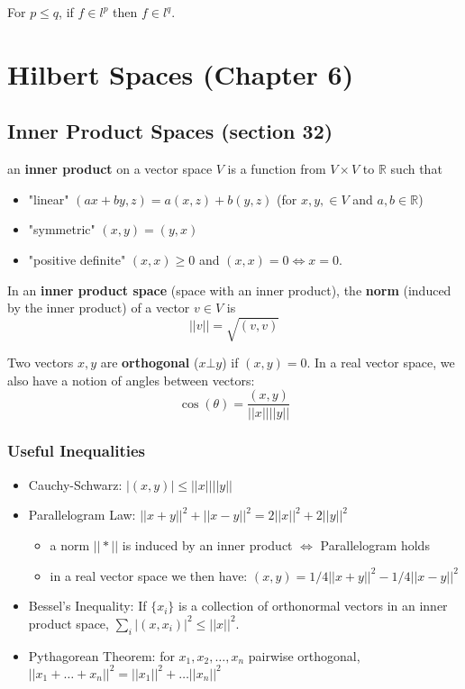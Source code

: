 \documentclass[a4paper, 12pt]{article}
\def\R{\ensuremath{\mathbb{R}}} %
\newcommand{\bt}[1]{\textbf{#1}} %
\newcommand{\gray}[1]{{\leavevmode\color[gray]{0.5}{#1}}} %
\begin{document}
\begin{multicols}{2}
For $p \leq q$, if $f \in l^p$ then $f \in l^q$.
\gray{why? $f \in l^p \implies \sum |a_n|^p$ converges, so $|a_n|^p < 1$ \\
hence $|a_n|^q \leq |a_n|^p$}



\section{Hilbert Spaces (Chapter 6)}

\subsection{Inner Product Spaces (section 32)}
an \bt{inner product} on a vector space $V$ is a function from  $V \times  V$ to $\R$ such that
\begin{itemize}
    \item "linear" $(ax + by, z) = a(x, z) + b(y, z)$ (for $x,y, \in V$ and $a, b \in \R$)

    \item "symmetric" $(x, y) = (y, x)$
    \item "positive definite" $(x, x) \geq 0$ and $(x, x) = 0 \iff x = 0$.
\end{itemize}

In an \bt{inner product space} (space with an inner product), the \bt{norm} 
(induced by the inner product) of a vector $v \in V$ is 
$$|| v || = \sqrt{(v, v)}$$

Two vectors $x, y$ are \bt{orthogonal} ($x \bot y$) if $(x, y) = 0$.
In a real vector space, we also have a notion of angles between vectors: 
$$\cos(\theta) = \frac{(x, y)}{|| x || || y ||}$$

\subsubsection{Useful Inequalities}

\begin{itemize}
    \item Cauchy-Schwarz: $|(x, y)| \leq || x || || y ||$
    \item Parallelogram Law: $|| x + y ||^2 + || x - y||^2 = 2 || x ||^2 + 2 || y ||^2$
    \begin{itemize}
        \item a norm $|| * ||$ is induced by an inner product $\iff$ Parallelogram holds
        \item in a real vector space we then have: 
        $(x, y) = 1/4 || x + y ||^2 - 1/4 || x - y ||^2$
    \end{itemize}
    \item Bessel's Inequality: If $\{x_i\}$ is a collection of orthonormal vectors in an 
    inner product space, $\sum_i |(x, x_i)|^2 \leq || x ||^2$.
    \item Pythagorean Theorem: for $x_1, x_2, \dots, x_n$ pairwise orthogonal, 
    $||x_1 + \dots + x_n||^2 = ||x_1||^2 + \dots ||x_n||^2$
\end{itemize}



\end{multicols}
\end{document}
